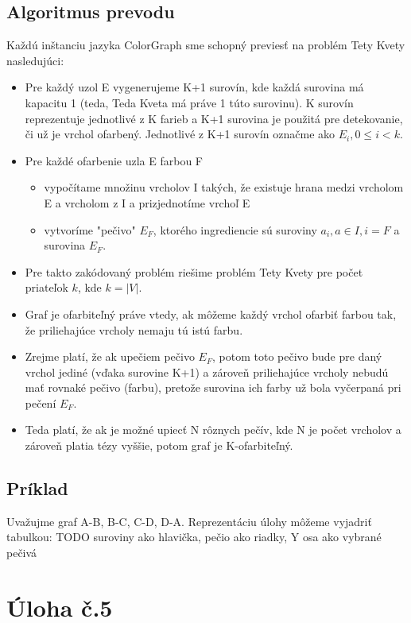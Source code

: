 \documentclass[10pt]{article}
\begin{document}
\subsection*{Algoritmus prevodu}
Každú inštanciu jazyka ColorGraph sme schopný previesť na problém Tety Kvety nasledujúci:
\begin{itemize}
    \item Pre každý uzol E vygenerujeme K+1 surovín, kde každá surovina má kapacitu 1 (teda, Teda
        Kveta má práve 1 túto surovinu). K surovín reprezentuje jednotlivé z K farieb a K+1 surovina
        je použitá pre detekovanie, či už je vrchol ofarbený.
        Jednotlivé z K+1 surovín označme ako $E_i, 0 \leq i < k$.
    \item Pre každé ofarbenie uzla E farbou F 
    \begin{itemize}
        \item vypočítame množinu vrcholov I takých, že existuje hrana medzi vrcholom E a vrcholom z
            I a prizjednotíme vrchoľ E
        \item vytvoríme "pečivo" $E_F$, ktorého ingrediencie sú suroviny $a_i, a \in I, i = F$ a
            surovina $E_F$.
    \end{itemize}
    \item Pre takto zakódovaný problém riešime problém Tety Kvety pre počet priateľok $k$, kde $k = |V|$.
    \item Graf je ofarbiteľný práve vtedy, ak môžeme každý vrchol ofarbiť farbou tak, že
        priliehajúce vrcholy nemaju tú istú farbu.
    \item Zrejme platí, že ak upečiem pečivo $E_F$, potom toto pečivo bude pre daný vrchol jediné
        (vďaka surovine K+1) a zároveň priliehajúce vrcholy nebudú mať rovnaké pečivo (farbu),
        pretože surovina ich farby už bola vyčerpaná pri pečení $E_F$.
    \item Teda platí, že ak je možné upiecť N rôznych pečív, kde N je počet vrcholov a zároveň
        platia tézy vyššie, potom graf je K-ofarbiteľný.
\end{itemize}
\subsection*{Príklad}
Uvažujme graf A-B, B-C, C-D, D-A. 
Reprezentáciu úlohy môžeme vyjadriť tabulkou:
TODO
suroviny ako hlavička, pečio ako riadky, Y osa ako vybrané pečivá
\section*{Úloha č.5}
\end{document}
